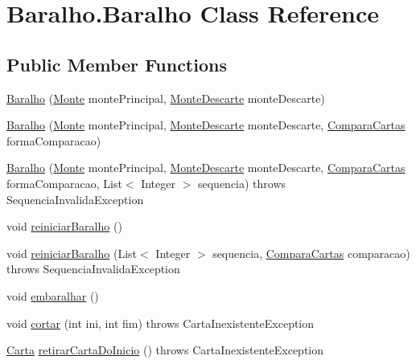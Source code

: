 \hypertarget{class_baralho_1_1_baralho}{
\section{\-Baralho.\-Baralho \-Class \-Reference}
\label{class_baralho_1_1_baralho}
}
\subsection*{\-Public \-Member \-Functions}
\begin{DoxyCompactItemize}
\item 
\hyperlink{class_baralho_1_1_baralho_ab88f90bd08144f150e97b45bd63eadfd}{\-Baralho} (\hyperlink{class_baralho_1_1_monte}{\-Monte} monte\-Principal, \hyperlink{class_baralho_1_1_monte_descarte}{\-Monte\-Descarte} monte\-Descarte)
\item 
\hyperlink{class_baralho_1_1_baralho_a039c014d8bf91ceda3b003a1ee4d2418}{\-Baralho} (\hyperlink{class_baralho_1_1_monte}{\-Monte} monte\-Principal, \hyperlink{class_baralho_1_1_monte_descarte}{\-Monte\-Descarte} monte\-Descarte, \hyperlink{interface_baralho_1_1_compara_cartas}{\-Compara\-Cartas} forma\-Comparacao)
\item 
\hyperlink{class_baralho_1_1_baralho_a749ad25fed6cc2df5be8e1b2d8db5881}{\-Baralho} (\hyperlink{class_baralho_1_1_monte}{\-Monte} monte\-Principal, \hyperlink{class_baralho_1_1_monte_descarte}{\-Monte\-Descarte} monte\-Descarte, \hyperlink{interface_baralho_1_1_compara_cartas}{\-Compara\-Cartas} forma\-Comparacao, \-List$<$ \-Integer $>$ sequencia)  throws Sequencia\-Invalida\-Exception
\item 
void \hyperlink{class_baralho_1_1_baralho_ae7ce198ebeadf6c0b3fb5ad109873f1c}{reiniciar\-Baralho} ()
\item 
void \hyperlink{class_baralho_1_1_baralho_a5d5b81ee3a6b48f6a99117172d23a24a}{reiniciar\-Baralho} (\-List$<$ \-Integer $>$ sequencia, \hyperlink{interface_baralho_1_1_compara_cartas}{\-Compara\-Cartas} comparacao)  throws Sequencia\-Invalida\-Exception
\item 
void \hyperlink{class_baralho_1_1_baralho_a50716e1d93b3ed27800ac62b7b9e8b8a}{embaralhar} ()
\item 
void \hyperlink{class_baralho_1_1_baralho_a6839090e52620e5b665a12aceeba06f6}{cortar} (int ini, int fim)  throws Carta\-Inexistente\-Exception
\item 
\hyperlink{class_baralho_1_1_carta}{\-Carta} \hyperlink{class_baralho_1_1_baralho_a88c1b1eec22e717be39227ed2ceb9490}{retirar\-Carta\-Do\-Inicio} ()  throws Carta\-Inexistente\-Exception

\end{DoxyCompactItemize}
